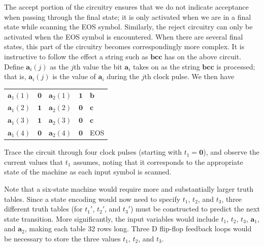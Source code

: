 The accept portion of the circuitry ensures that we do not indicate acceptance
when passing through the final state; it is only activated when we are in a
final state while scanning the \<EOS\> symbol. Similarly, the reject circuitry
can only be activated when the \<EOS\> symbol is encountered. When there are
several final states, this part of the circuitry becomes correspondingly more
complex. It is instructive to follow the effect a string such as $\pmb{bcc}$ has
on the above circuit. Define $\pmb{a}_i(j)$ as the $j$th value the bit $\pmb{a}_i$
takes on as the string $\pmb{bcc}$ is processed; that is, $\pmb{a}_i(j)$ is the
value of $\pmb{a}_i$ during the $j$th clock pulse. We then have
\begin{center}\begin{tabular}{r@{ $=$ }l@{$\qquad$}r@{ $=$ }l@{$\qquad\Rightarrow$ }l}
$\pmb{a}_1(1)$ & $\pmb{0}$ & $\pmb{a}_2(1)$ & $\pmb{1}$ & $\pmb{b}$ \\
$\pmb{a}_1(2)$ & $\pmb{1}$ & $\pmb{a}_2(2)$ & $\pmb{0}$ & $\pmb{c}$ \\
$\pmb{a}_1(3)$ & $\pmb{1}$ & $\pmb{a}_2(3)$ & $\pmb{0}$ & $\pmb{c}$ \\
$\pmb{a}_1(4)$ & $\pmb{0}$ & $\pmb{a}_2(4)$ & $\pmb{0}$ & \<EOS\>
\end{tabular}\end{center}
Trace the circuit through four clock pulses (starting with $t_1=\pmb{0}$), and
observe the current values that $t_1$ assumes, noting that it corresponds to the
appropriate state of the machine as each input symbol is scanned.

Note that a six-state machine would require more and substantially larger
truth tables. Since a state encoding would now need to specify $t_1$, $t_2$, and
$t_3$, three different truth tables (for $t_1'$, $t_2'$, and $t_3'$) must be
constructed to predict the next state transition. More significantly, the input
variables would include $t_1$, $t_2$, $t_3$, $\pmb{a}_1$, and $\pmb{a}_2$,
making each table 32 rows long. Three D flip-flop feedback loops would be
necessary to store the three values $t_1$, $t_2$, and $t_3$.

